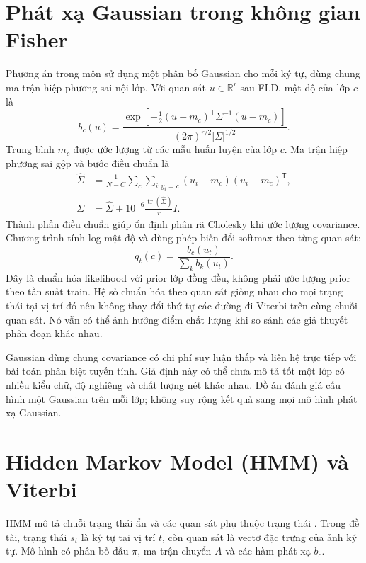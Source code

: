 \section{Phát xạ Gaussian trong không gian Fisher}
Phương án trong môn sử dụng một phân bố Gaussian cho mỗi ký tự, dùng chung ma trận hiệp phương sai nội lớp. Với quan sát $u\in\mathbb{R}^{r}$ sau FLD, mật độ của lớp $c$ là
\begin{equation}
b_c(u)=\frac{\exp\left[-\frac12(u-m_c)^\mathsf{T}\Sigma^{-1}(u-m_c)\right]}
{(2\pi)^{r/2}|\Sigma|^{1/2}}.
\end{equation}
Trung bình $m_c$ được ước lượng từ các mẫu huấn luyện của lớp $c$. Ma trận hiệp phương sai gộp và bước điều chuẩn là
\begin{align}
\widehat\Sigma&=\frac{1}{N-C}\sum_c\sum_{i:y_i=c}(u_i-m_c)(u_i-m_c)^\mathsf{T},\\
\Sigma&=\widehat\Sigma+10^{-6}\frac{\operatorname{tr}(\widehat\Sigma)}{r}I.
\end{align}
Thành phần điều chuẩn giúp ổn định phân rã Cholesky khi ước lượng covariance. Chương trình tính log mật độ và dùng phép biến đổi softmax theo từng quan sát:
\begin{equation}
q_t(c)=\frac{b_c(u_t)}{\sum_k b_k(u_t)}.
\end{equation}
Đây là chuẩn hóa likelihood với prior lớp đồng đều, không phải ước lượng prior theo tần suất train. Hệ số chuẩn hóa theo quan sát giống nhau cho mọi trạng thái tại vị trí đó nên không thay đổi thứ tự các đường đi Viterbi trên cùng chuỗi quan sát. Nó vẫn có thể ảnh hưởng điểm chất lượng khi so sánh các giả thuyết phân đoạn khác nhau.

Gaussian dùng chung covariance có chi phí suy luận thấp và liên hệ trực tiếp với bài toán phân biệt tuyến tính. Giả định này có thể chưa mô tả tốt một lớp có nhiều kiểu chữ, độ nghiêng và chất lượng nét khác nhau. Đồ án đánh giá cấu hình một Gaussian trên mỗi lớp; không suy rộng kết quả sang mọi mô hình phát xạ Gaussian.

\section{Hidden Markov Model (HMM) và Viterbi}
HMM mô tả chuỗi trạng thái ẩn và các quan sát phụ thuộc trạng thái \cite{hmm}. Trong đề tài, trạng thái $s_t$ là ký tự tại vị trí $t$, còn quan sát là vectơ đặc trưng của ảnh ký tự. Mô hình có phân bố đầu $\pi$, ma trận chuyển $A$ và các hàm phát xạ $b_c$.

